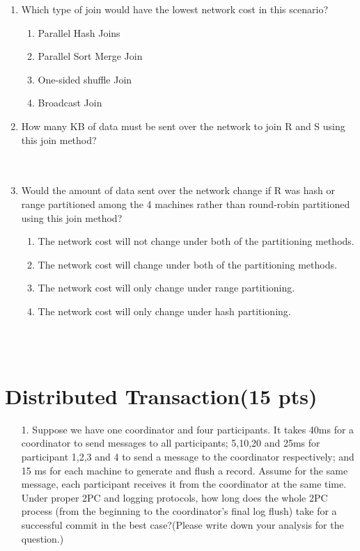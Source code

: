 \documentclass[paper=a4, fontsize=11pt]{scrartcl}
\numberwithin{equation}{section}		%
\numberwithin{figure}{section}			%
\numberwithin{table}{section}				%
\begin{document}
\begin{enumerate}
    \item Which type of join would have the lowest network cost in this scenario?
    \begin{enumerate}
        \item Parallel Hash Joins
        \item Parallel Sort Merge Join
        \item One-sided shuffle Join
        \item Broadcast Join
    \end{enumerate}

    \item How many KB of data must be sent over the network to join R and S using this join method? \\ \\ \\

    \item Would the amount of data sent over the network change if R was hash or range partitioned among the 4 machines rather than round-robin partitioned using this join method? 
    \begin{enumerate}
        \item The network cost will not change under both of the partitioning methods.
        \item The network cost will change under both of the partitioning methods.
        \item The network cost will only change under range partitioning.
        \item The network cost will only change under hash partitioning.
    \end{enumerate}

\end{enumerate}
\\~\\





\section{Distributed Transaction(15 pts)}
\begin{itemize}
\item [1.] Suppose we have one coordinator and four participants. It takes 40ms for a coordinator to send messages to all participants; 5,10,20 and 25ms for participant 1,2,3 and 4 to send a message to the coordinator respectively; and 15 ms for each machine to generate and flush a record. Assume for the same message, each participant receives it from the coordinator at the same time. \\
    Under proper 2PC and logging protocols, how long does the whole 2PC process (from the beginning to the coordinator's final log flush) take for a successful commit in the best case?(Please write down your analysis for the question.)\\~\\~\\~\\~\\
\end{itemize}
\end{document}
